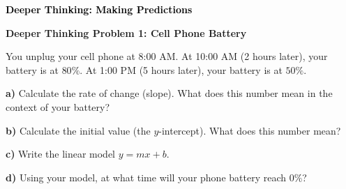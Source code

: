\documentclass[12pt, letterpaper, fleqn]{article}
\begin{document}
\newpage

\begin{tcolorbox}[colback=customteal!20]
\large\textcolor{black}{\textbf{Deeper Thinking: Making Predictions}}
\end{tcolorbox}

\vspace{3mm}

\begin{tcolorbox}[colback=white!15, colframe=black, boxrule=1.5pt, arc=4mm, left=6mm, right=6mm, top=5mm, bottom=5mm]

\textbf{Deeper Thinking Problem 1: Cell Phone Battery}

\medskip

\noindent
You unplug your cell phone at 8:00 AM. At 10:00 AM (2 hours later), your battery is at $80\%$. At 1:00 PM (5 hours later), your battery is at $50\%$.

\vspace{5mm}

\noindent
\textbf{a)} Calculate the rate of change (slope). What does this number mean in the context of your battery?

\vspace{3cm}

\noindent
\textbf{b)} Calculate the initial value (the $y$-intercept). What does this number mean?

\vspace{3cm}

\noindent
\textbf{c)} Write the linear model $y = mx + b$.

\vspace{1.5cm}

\noindent
\textbf{d)} Using your model, at what time will your phone battery reach $0\%$?

\vspace{3cm}

\end{tcolorbox}
\end{document}
